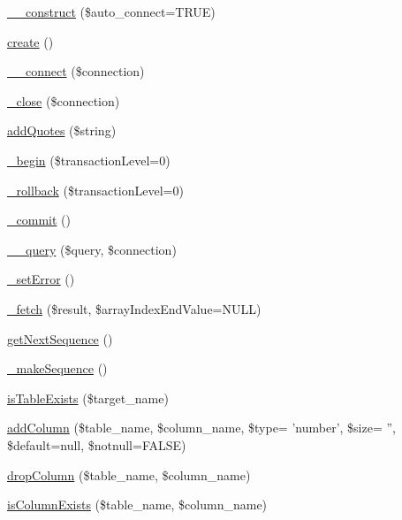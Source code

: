 \begin{DoxyCompactItemize}
\item 
\hyperlink{classDBCubrid_a67e38603fa233d859ce75c7e64d5beec}{\-\_\-\-\_\-construct} (\$auto\-\_\-connect=T\-R\-U\-E)
\item 
\hyperlink{classDBCubrid_a9a5f425a0abce46d33a6d713b7dd407f}{create} ()
\item 
\hyperlink{classDBCubrid_aa0798dadf20548b2c38e925f391c72f2}{\-\_\-\-\_\-connect} (\$connection)
\item 
\hyperlink{classDBCubrid_ab1a7b718fc864d7b5992cd99abfe2690}{\-\_\-close} (\$connection)
\item 
\hyperlink{classDBCubrid_ab9aea745152a86b3852101aa3225f26d}{add\-Quotes} (\$string)
\item 
\hyperlink{classDBCubrid_a4982cdf2544caf63427258ba5d03ef83}{\-\_\-begin} (\$transaction\-Level=0)
\item 
\hyperlink{classDBCubrid_ac1173f02246bee40975fe2a96973abd0}{\-\_\-rollback} (\$transaction\-Level=0)
\item 
\hyperlink{classDBCubrid_ac8cce69fb6939b2383eb03214ff2522b}{\-\_\-commit} ()
\item 
\hyperlink{classDBCubrid_a2319e8c887147d9596e096088ff67c6a}{\-\_\-\-\_\-query} (\$query, \$connection)
\item 
\hyperlink{classDBCubrid_aaf7dd65f4cdfea9903ab641163058936}{\-\_\-set\-Error} ()
\item 
\hyperlink{classDBCubrid_abb95044521be20a8b2ba105ab623b4d9}{\-\_\-fetch} (\$result, \$array\-Index\-End\-Value=N\-U\-L\-L)
\item 
\hyperlink{classDBCubrid_a56780e480de62dfca8d67c7bccb4791c}{get\-Next\-Sequence} ()
\item 
\hyperlink{classDBCubrid_ac91bfc1859aaeb1a8d7a58e56829d4de}{\-\_\-make\-Sequence} ()
\item 
\hyperlink{classDBCubrid_aa88914b97476deb6c292a44bff2f2f40}{is\-Table\-Exists} (\$target\-\_\-name)
\item 
\hyperlink{classDBCubrid_a10207e248b4aa36b60cf4adacfb44889}{add\-Column} (\$table\-\_\-name, \$column\-\_\-name, \$type= 'number', \$size= '', \$default=null, \$notnull=F\-A\-L\-S\-E)
\item 
\hyperlink{classDBCubrid_ad0b269d73617c6de8b3135ee36ae43d2}{drop\-Column} (\$table\-\_\-name, \$column\-\_\-name)
\item 
\hyperlink{classDBCubrid_a76c8d9dd51a3e64f18b8d1f4da318ac7}{is\-Column\-Exists} (\$table\-\_\-name, \$column\-\_\-name)
\item 

\end{DoxyCompactItemize}
